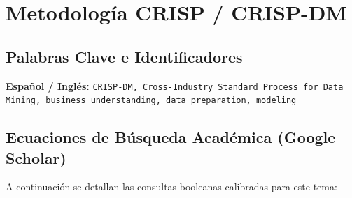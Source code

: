 \section{Metodología CRISP / CRISP-DM}
\label{sec:03_CRISP_DM}


\subsection{Palabras Clave e Identificadores}
\textbf{Español / Inglés:} \texttt{CRISP-DM, Cross-Industry Standard Process for Data Mining, business understanding, data preparation, modeling}


\subsection{Ecuaciones de Búsqueda Académica (Google Scholar)}
A continuación se detallan las consultas booleanas calibradas para este tema:
